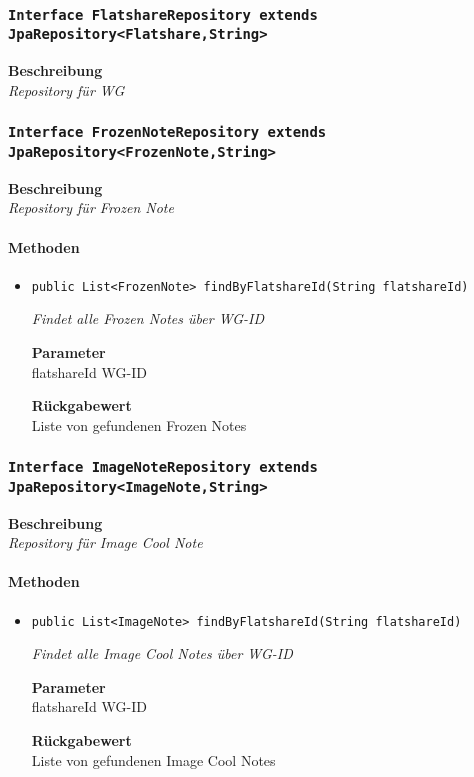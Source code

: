      \subsubsection{\texttt{Interface FlatshareRepository extends JpaRepository<Flatshare,String>}}
     \textbf{Beschreibung} \\
     \textit{Repository für WG}
     \subsubsection{\texttt{Interface FrozenNoteRepository extends JpaRepository<FrozenNote,String>}}
     \textbf{Beschreibung} \\
     \textit{Repository für Frozen Note}
     \paragraph*{Methoden}
     \begin{itemize}
     	\item{\texttt{public List<FrozenNote> findByFlatshareId(String flatshareId)}}
     	
     	\textit{Findet alle Frozen Notes über WG-ID}
     	
     	\textbf{Parameter} \\
     	flatshareId WG-ID
     	
     	\textbf{Rückgabewert} \\
     	Liste von gefundenen Frozen Notes
     \end{itemize}
     \subsubsection{\texttt{Interface ImageNoteRepository extends JpaRepository<ImageNote,String>}}
     \textbf{Beschreibung} \\
     \textit{Repository für Image Cool Note}
     \paragraph*{Methoden}
     \begin{itemize}
     	\item{\texttt{public List<ImageNote> findByFlatshareId(String flatshareId)}}
     	
     	\textit{Findet alle Image Cool Notes über WG-ID}
     	
     	\textbf{Parameter} \\
     	flatshareId WG-ID
     	
     	\textbf{Rückgabewert} \\
     	Liste von gefundenen Image Cool Notes
     \end{itemize}
